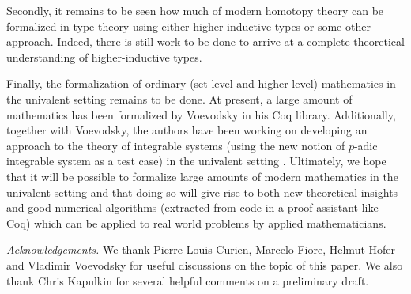 \documentclass[11pt]{amsart}
\theoremstyle{definition}
\theoremstyle{remark}
\numberwithin{equation}{section}
\begin{document}
Secondly, it remains to be seen how much of modern homotopy theory can
be formalized in type theory using either higher-inductive types or
some other approach.  Indeed, there is still work to be done to arrive
at a complete theoretical understanding of higher-inductive types.

Finally, the formalization of ordinary (set level and higher-level)
mathematics in the univalent setting remains to be done.  At present,
a large amount of mathematics has been formalized by Voevodsky in his
Coq library.  Additionally, together with Voevodsky, the authors have
been working on developing an approach to the theory of integrable
systems (using the new notion of $p$-adic integrable system as a test
case) in the univalent setting \cite{PeVoWa2012}.  Ultimately, we hope that it
will be possible to formalize large amounts of modern mathematics in
the univalent setting and that doing so will give rise to both new
theoretical insights and good numerical algorithms (extracted from code in
a proof assistant like Coq) which can be applied to real world
problems by applied mathematicians.











\emph{Acknowledgements.} We thank Pierre-Louis Curien, Marcelo Fiore, Helmut Hofer and Vladimir
Voevodsky for useful discussions on the topic of this paper.  We
also thank Chris Kapulkin for several helpful comments on a
preliminary draft.



\end{document}
